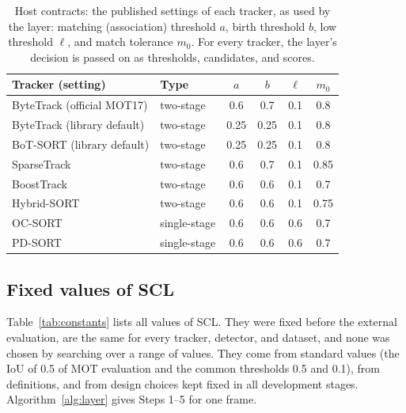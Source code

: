 \documentclass[pdflatex,sn-mathphys-num,iicol]{sn-jnl}
\newcommand{\scl}{SCL}
\begin{document}
\begin{table}[!tb]
\caption{Host contracts: the published settings of each tracker, as used by the layer: matching
(association) threshold $a$, birth threshold $b$, low threshold $\ell$, and match tolerance $m_0$.
For every tracker, the layer's decision is passed on as thresholds, candidates, and scores.}
\label{tab:contracts}
\centering\footnotesize
\setlength{\tabcolsep}{4pt}
\begin{tabular}{@{}>{\raggedright\arraybackslash}p{27mm}lcccc@{}}
\toprule
Tracker (setting) & Type & $a$ & $b$ & $\ell$ & $m_0$\\
\midrule
ByteTrack (official MOT17) & two-stage & 0.6 & 0.7 & 0.1 & 0.8\\
ByteTrack (library default) & two-stage & 0.25 & 0.25 & 0.1 & 0.8\\
BoT-SORT (library default) & two-stage & 0.25 & 0.25 & 0.1 & 0.8\\
SparseTrack & two-stage & 0.6 & 0.7 & 0.1 & 0.85\\
BoostTrack & two-stage & 0.6 & 0.6 & 0.1 & 0.7\\
Hybrid-SORT & two-stage & 0.6 & 0.6 & 0.1 & 0.75\\
OC-SORT & single-stage & 0.6 & 0.6 & 0.6 & 0.7\\
PD-SORT & single-stage & 0.6 & 0.6 & 0.6 & 0.7\\
\bottomrule
\end{tabular}
\end{table}

\subsection{Fixed values of SCL}\label{sec:constants}
Table~\ref{tab:constants} lists all values of \scl{}. They were fixed before the external
evaluation, are the same for every tracker, detector, and dataset, and none was chosen by searching
over a range of values. They come from standard values (the IoU of 0.5 of MOT evaluation and the
common thresholds 0.5 and 0.1), from definitions, and from design choices kept fixed in all
development stages. Algorithm~\ref{alg:layer} gives Steps 1--5 for one frame.
\end{document}
